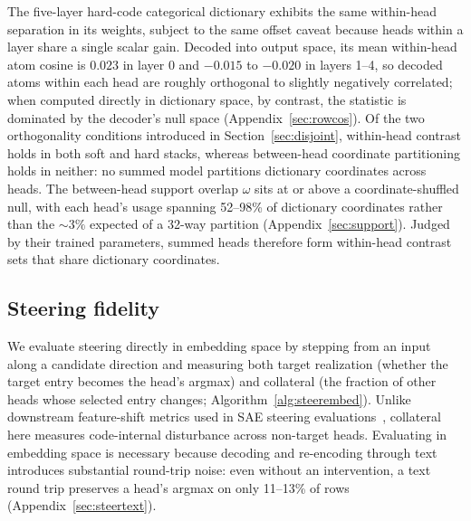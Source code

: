 The five-layer hard-code categorical dictionary exhibits the same
within-head separation in its weights, subject to the same offset caveat
because heads within a layer share a single scalar gain. Decoded into
output space, its mean within-head atom cosine is $0.023$ in layer 0 and
$-0.015$ to $-0.020$ in layers 1--4, so decoded atoms within each head are
roughly orthogonal to slightly negatively correlated; when computed
directly in dictionary space, by contrast, the statistic is dominated by
the decoder's null space (Appendix~\ref{sec:rowcos}). Of the two
orthogonality conditions introduced
in Section~\ref{sec:disjoint}, within-head contrast holds in both soft and
hard stacks, whereas between-head coordinate partitioning holds in neither:
no summed model partitions dictionary coordinates across heads. The
between-head support overlap $\omega$ sits at or above
a coordinate-shuffled null, with each head's usage spanning 52--98\% of
dictionary coordinates rather than the ${\sim}3\%$ expected of a 32-way
partition (Appendix~\ref{sec:support}). Judged by their trained parameters,
summed heads therefore form within-head contrast sets that share dictionary
coordinates.

\subsection{Steering fidelity}
\label{sec:steer}

We evaluate steering directly in embedding space by stepping from an input
along a candidate direction and measuring both target realization (whether
the target entry becomes the head's argmax) and collateral (the fraction of
other heads whose selected entry changes; Algorithm~\ref{alg:steerembed}).
Unlike downstream feature-shift metrics used in SAE steering
evaluations~\cite{duan2026}, collateral here measures code-internal
disturbance across non-target heads. Evaluating in embedding space is
necessary because decoding and re-encoding through text introduces substantial
round-trip noise: even without an intervention, a text round trip preserves a
head's argmax on only 11--13\% of rows (Appendix~\ref{sec:steertext}).

